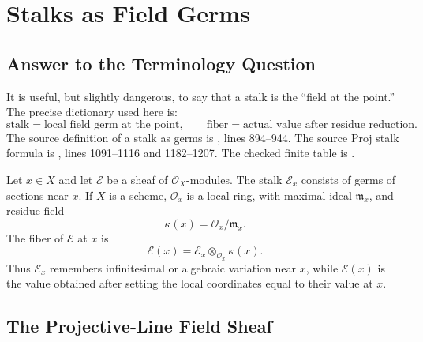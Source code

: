 
\section{Stalks as Field Germs}
\label{sec:stalks-as-field-germs}

\subsection{Answer to the Terminology Question}

It is useful, but slightly dangerous, to say that a stalk is the ``field at the
point.''  The precise dictionary used here is:
\[
  \text{stalk}=\text{local field germ at the point},
  \qquad
  \text{fiber}=\text{actual value after residue reduction}.
\]
The source definition of a stalk as germs is
, lines
894--944.  The source Proj stalk formula is
, lines
1091--1116 and 1182--1207.  The checked finite table is
.

Let \(x\in X\) and let \(\mathcal E\) be a sheaf of
\(\mathcal O_X\)-modules.  The stalk \(\mathcal E_x\) consists of germs of
sections near \(x\).  If \(X\) is a scheme, \(\mathcal O_x\) is a local ring,
with maximal ideal \(\mathfrak m_x\), and residue field
\[
  \kappa(x)=\mathcal O_x/\mathfrak m_x.
\]
The fiber of \(\mathcal E\) at \(x\) is
\[
  \mathcal E(x)=\mathcal E_x\otimes_{\mathcal O_x}\kappa(x).
\]
Thus \(\mathcal E_x\) remembers infinitesimal or algebraic variation near
\(x\), while \(\mathcal E(x)\) is the value obtained after setting the local
coordinates equal to their value at \(x\).

\subsection{The Projective-Line Field Sheaf}

